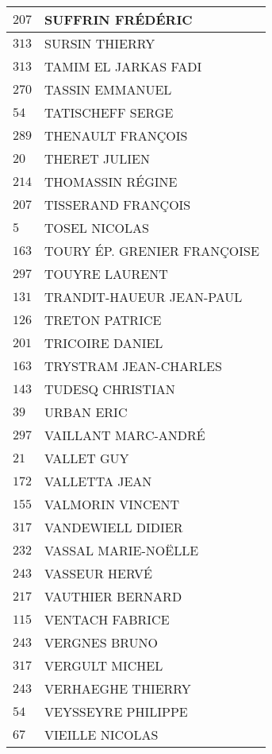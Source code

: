 \begin{xltabular}{\linewidth}{|l|X|}
    \hline
    $207$ & SUFFRIN FRÉDÉRIC \\
    \hline
    $313$ & SURSIN THIERRY \\
    \hline
    $313$ & TAMIM EL JARKAS FADI \\
    \hline
    $270$ & TASSIN EMMANUEL \\
    \hline
    $54$ & TATISCHEFF SERGE \\
    \hline
    $289$ & THENAULT FRANÇOIS \\
    \hline
    $20$ & THERET JULIEN \\
    \hline
    $214$ & THOMASSIN RÉGINE \\
    \hline
    $207$ & TISSERAND FRANÇOIS \\
    \hline
    $5$ & TOSEL NICOLAS \\
    \hline
    $163$ & TOURY ÉP. GRENIER FRANÇOISE \\
    \hline
    $297$ & TOUYRE LAURENT \\
    \hline
    $131$ & TRANDIT-HAUEUR JEAN-PAUL \\
    \hline
    $126$ & TRETON PATRICE \\
    \hline
    $201$ & TRICOIRE DANIEL \\
    \hline
    $163$ & TRYSTRAM JEAN-CHARLES \\
    \hline
    $143$ & TUDESQ CHRISTIAN \\
    \hline
    $39$ & URBAN ERIC \\
    \hline
    $297$ & VAILLANT MARC-ANDRÉ \\
    \hline
    $21$ & VALLET GUY \\
    \hline
    $172$ & VALLETTA JEAN \\
    \hline
    $155$ & VALMORIN VINCENT \\
    \hline
    $317$ & VANDEWIELL DIDIER \\
    \hline
    $232$ & VASSAL MARIE-NOËLLE \\
    \hline
    $243$ & VASSEUR HERVÉ \\
    \hline
    $217$ & VAUTHIER BERNARD \\
    \hline
    $115$ & VENTACH FABRICE \\
    \hline
    $243$ & VERGNES BRUNO \\
    \hline
    $317$ & VERGULT MICHEL \\
    \hline
    $243$ & VERHAEGHE THIERRY \\
    \hline
    $54$ & VEYSSEYRE PHILIPPE \\
    \hline
    $67$ & VIEILLE NICOLAS \\

\end{xltabular}
